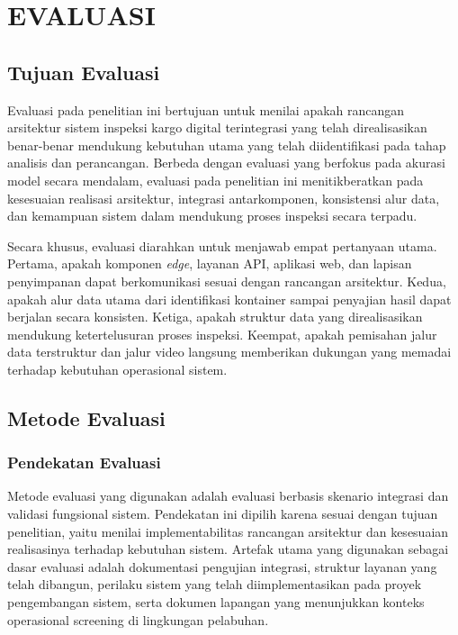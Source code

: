 \cleardoublepage
\chapter{EVALUASI}
\label{chap:evaluasi}

\section{Tujuan Evaluasi}
\label{sec:tujuan-evaluasi}

Evaluasi pada penelitian ini bertujuan untuk menilai apakah rancangan
arsitektur sistem inspeksi kargo digital terintegrasi yang telah direalisasikan
benar-benar mendukung kebutuhan utama yang telah diidentifikasi pada tahap
analisis dan perancangan. Berbeda dengan evaluasi yang berfokus pada akurasi
model secara mendalam, evaluasi pada penelitian ini menitikberatkan pada
kesesuaian realisasi arsitektur, integrasi antarkomponen, konsistensi alur data,
dan kemampuan sistem dalam mendukung proses inspeksi secara terpadu.

Secara khusus, evaluasi diarahkan untuk menjawab empat pertanyaan utama.
Pertama, apakah komponen \textit{edge}, layanan API, aplikasi web, dan lapisan
penyimpanan dapat berkomunikasi sesuai dengan rancangan arsitektur. Kedua,
apakah alur data utama dari identifikasi kontainer sampai penyajian hasil dapat
berjalan secara konsisten. Ketiga, apakah struktur data yang direalisasikan
mendukung ketertelusuran proses inspeksi. Keempat, apakah pemisahan jalur data
terstruktur dan jalur video langsung memberikan dukungan yang memadai terhadap
kebutuhan operasional sistem.

\section{Metode Evaluasi}
\label{sec:metode-evaluasi}

\subsection{Pendekatan Evaluasi}
\label{subsec:pendekatan-evaluasi}

Metode evaluasi yang digunakan adalah evaluasi berbasis skenario integrasi dan
validasi fungsional sistem. Pendekatan ini dipilih karena sesuai dengan tujuan
penelitian, yaitu menilai implementabilitas rancangan arsitektur dan kesesuaian
realisasinya terhadap kebutuhan sistem. Artefak utama yang digunakan sebagai
dasar evaluasi adalah dokumentasi pengujian integrasi, struktur layanan
yang telah dibangun, perilaku sistem yang telah diimplementasikan pada
proyek pengembangan sistem, serta dokumen lapangan yang menunjukkan konteks
operasional screening di lingkungan pelabuhan.

